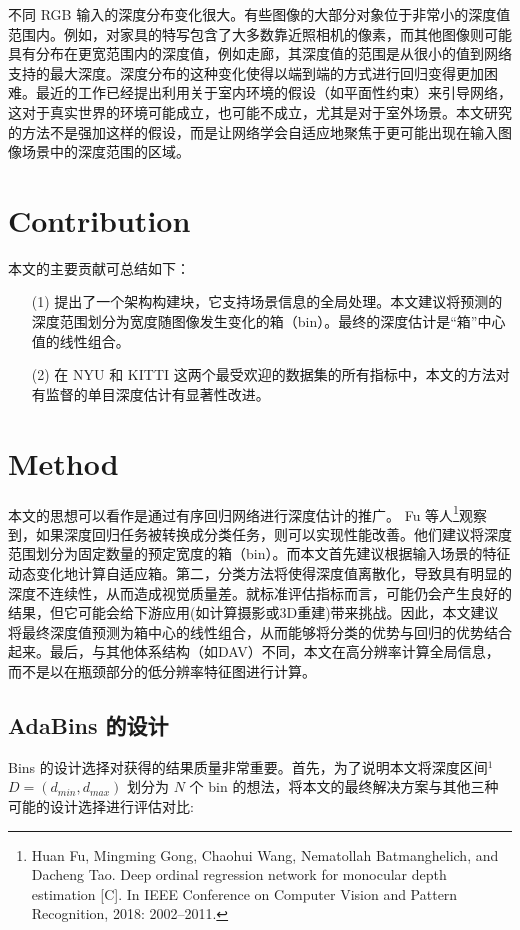 \documentclass{vip-theme}
\begin{document}
不同 RGB 输入的深度分布变化很大。有些图像的大部分对象位于非常小的深度值范围内。例如，对家具的特写包含了大多数靠近照相机的像素，而其他图像则可能具有分布在更宽范围内的深度值，例如走廊，其深度值的范围是从很小的值到网络支持的最大深度。深度分布的这种变化使得以端到端的方式进行回归变得更加困难。最近的工作已经提出利用关于室内环境的假设（如平面性约束）来引导网络，这对于真实世界的环境可能成立，也可能不成立，尤其是对于室外场景。本文研究的方法不是强加这样的假设，而是让网络学会自适应地聚焦于更可能出现在输入图像场景中的深度范围的区域。



\section{Contribution}
\label{contribution}

本文的主要贡献可总结如下：
\begin{enumerate}
	
	\item[(1)]	提出了一个架构构建块，它支持场景信息的全局处理。本文建议将预测的深度范围划分为宽度随图像发生变化的箱（bin）。最终的深度估计是“箱”中心值的线性组合。
	\item[(2)]	在 NYU 和 KITTI 这两个最受欢迎的数据集的所有指标中，本文的方法对有监督的单目深度估计有显著性改进。
\end{enumerate}


\section{Method}
\label{method}

 本文的思想可以看作是通过有序回归网络进行深度估计的推广。 Fu 等人\footnote{Huan Fu, Mingming Gong, Chaohui Wang, Nematollah Batmanghelich, and Dacheng Tao. Deep ordinal regression network for monocular depth estimation [C]. In IEEE Conference on Computer Vision and Pattern Recognition, 2018: 2002–2011.}观察到，如果深度回归任务被转换成分类任务，则可以实现性能改善。他们建议将深度范围划分为固定数量的预定宽度的箱（bin）。而本文首先建议根据输入场景的特征动态变化地计算自适应箱。第二，分类方法将使得深度值离散化，导致具有明显的深度不连续性，从而造成视觉质量差。就标准评估指标而言，可能仍会产生良好的结果，但它可能会给下游应用(如计算摄影或3D重建)带来挑战。因此，本文建议将最终深度值预测为箱中心的线性组合，从而能够将分类的优势与回归的优势结合起来。最后，与其他体系结构（如DAV）不同，本文在高分辨率计算全局信息，而不是以在瓶颈部分的低分辨率特征图进行计算。


\subsection{AdaBins 的设计}
Bins 的设计选择对获得的结果质量非常重要。首先，为了说明本文将深度区间$^1$ $D = (d_{min} , d_{max} )$ 划分为 $N$ 个 bin 的想法，将本文的最终解决方案与其他三种可能的设计选择进行评估对比:
 
\end{document}
